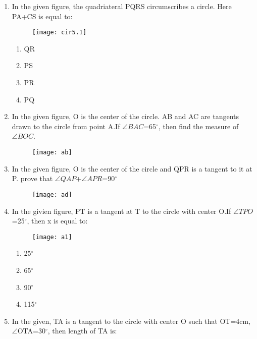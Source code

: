 \documentclass{article}
\newcommand\tab[1][1cm]{\hspace*{#1}}
\begin{document}
\begin{enumerate}
		(b) find the length of OB.\\
		(c) find the length of PQ.\\
		\tab[2cm]OR\\
		\tab[0.5cm]find the length of PQ.
	\item In the given figure, the quadriateral PQRS circumscribes a circle. Here PA+CS is equal to:
		\begin{figure}[h]
			\centering
			\texttt{[image: cir5.1]}
		\end{figure}
		\begin{multicols}{2}
			\begin{enumerate}
				\item QR
				\item PS
				\item PR
				\item PQ
			\end{enumerate}
		\end{multicols}
	\item In the given figure, O is the center of the circle. AB and AC are tangents drawn to the circle from point A.If $\angle{BAC}$=65$^\circ$, then find the measure of $\angle{BOC}$.
		\begin{figure}[h]
			\centering
			\texttt{[image: ab]}
		\end{figure}
	\item In the given figure, O is the center of the circle and QPR is a tangent to it at P. prove that $\angle{QAP}$+$\angle{APR}$=90$^\circ$
		\begin{figure}[h]
			\centering
			\texttt{[image: ad]}
		\end{figure}
	\item In the givien figure, PT is a tangent at T to the circle  with center O.If $\angle{TPO}$=25$^\circ$, then x is equal to:
		\begin{figure}[h]
			\centering
			\texttt{[image: a1]}
		\end{figure}
		\begin{enumerate}
			\item 25$^\circ$
			\item 65$^\circ$
			\item 90$^\circ$
			\item 115$^\circ$
		\end{enumerate}
	\item In the given, TA is a tangent to the circle with center O such that OT=4cm, $\angle${OTA}=30$^\circ$, then length of TA is:

\end{enumerate}
\end{document}
